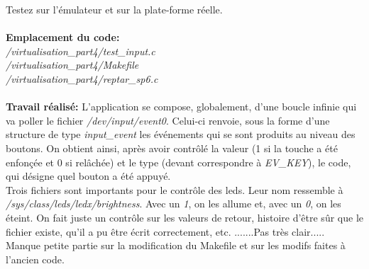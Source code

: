 Testez sur l’émulateur et sur la plate-forme réelle.\\\\
\textbf{Emplacement du code:}\\\textit{/virtualisation\_part4/test\_input.c}\\
\textit{/virtualisation\_part4/Makefile}\\
\textit{/virtualisation\_part4/reptar\_sp6.c}\\\\

\textbf{Travail réalisé: }
L'application se compose, globalement, d'une boucle infinie qui va poller le fichier \textit{/dev/input/event0}. Celui-ci renvoie, sous la forme d'une structure de type \textit{input\_event} les événements qui se sont produits au niveau des boutons. On obtient ainsi, après avoir contrôlé la valeur (1 si la touche a été enfonçée et 0 si relâchée) et le type (devant correspondre à \textit{EV\_KEY}), le code, qui désigne quel bouton a été appuyé.\\
\color{red}Trois fichiers sont importants pour le contrôle des leds. Leur nom ressemble à \textit{/sys/class/leds/ledx/brightness}. Avec un \textit{1}, on les allume et, avec un \textit{0}, on les éteint. On fait juste un contrôle sur les valeurs de retour, histoire d'être sûr que le fichier existe, qu'il a pu être écrit correctement, etc. \color{black} .......Pas très clair.....\\
\color{red}Manque petite partie sur la modification du Makefile et sur les modifs faites à l'ancien code. \color{black}\\\\

